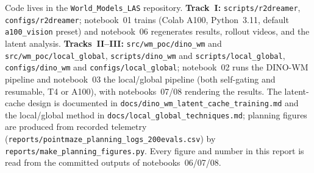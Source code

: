 \documentclass[11pt,a4paper]{article}
\begin{document}
{\sloppy
Code lives in the \texttt{World\_Models\_LAS} repository. \textbf{Track~I:}
\texttt{scripts/r2dreamer}, \texttt{configs/r2dreamer}; notebook~01 trains
(Colab A100, Python~3.11, default \texttt{a100\_vision} preset) and notebook~06
regenerates results, rollout videos, and the latent analysis.
\textbf{Tracks~II--III:} \texttt{src/wm\_poc/dino\_wm} and
\texttt{src/wm\_poc/local\_global}, \texttt{scripts/dino\_wm} and
\texttt{scripts/local\_global}, \texttt{configs/dino\_wm} and
\texttt{configs/local\_global}; notebook~02 runs the DINO-WM pipeline and
notebook~03 the local/global pipeline (both self-gating and resumable, T4 or
A100), with notebooks~07/08 rendering the results. The latent-cache design is
documented in \texttt{docs/dino\_wm\_latent\_cache\_training.md} and the
local/global method in \texttt{docs/local\_global\_techniques.md}; planning
figures are produced from recorded telemetry
(\texttt{reports/pointmaze\_planning\_logs\_200evals.csv}) by
\texttt{reports/make\_planning\_figures.py}. Every figure and number in this
report is read from the committed outputs of notebooks~06/07/08.
\par}
\end{document}
